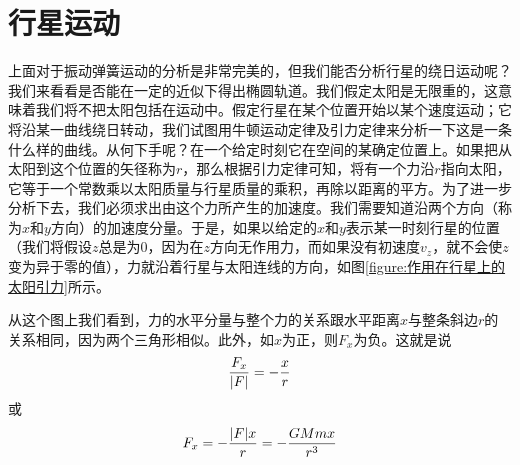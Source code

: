 \section{行星运动}

上面对于振动弹簧运动的分析是非常完美的，但我们能否分析行星的绕日运动呢？我们来看看是否能在一定的近似下得出椭圆轨道。我们假定太阳是无限重的，这意味着我们将不把太阳包括在运动中。假定行星在某个位置开始以某个速度运动；它将沿某一曲线绕日转动，我们试图用牛顿运动定律及引力定律来分析一下这是一条什么样的曲线。从何下手呢？在一个给定时刻它在空间的某确定位置上。如果把从太阳到这个位置的矢径称为$r$，那么根据引力定律可知，将有一个力沿$r$指向太阳，它等于一个常数乘以太阳质量与行星质量的乘积，再除以距离的平方。为了进一步分析下去，我们必须求出由这个力所产生的加速度。我们需要知道沿两个方向（称为$x$和$y$方向）的加速度分量。于是，如果以给定的$x$和$y$表示某一时刻行星的位置（我们将假设$z$总是为0，因为在$z$方向无作用力，而如果没有初速度$v_z$，就不会使$z$变为异于零的值），力就沿着行星与太阳连线的方向，如图\ref{figure:作用在行星上的太阳引力}所示。

从这个图上我们看到，力的水平分量与整个力的关系跟水平距离$x$与整条斜边$r$的关系相同，因为两个三角形相似。此外，如$x$为正，则$F_x$为负。这就是说
\begin{equation*}
    \frac{F_x}{\lvert F\rvert}=-\frac{x}{r}
\end{equation*}
或
\begin{equation*}
    F_x=-\frac{\lvert F\rvert x}{r}=-\frac{GMmx}{r^3}
\end{equation*}

